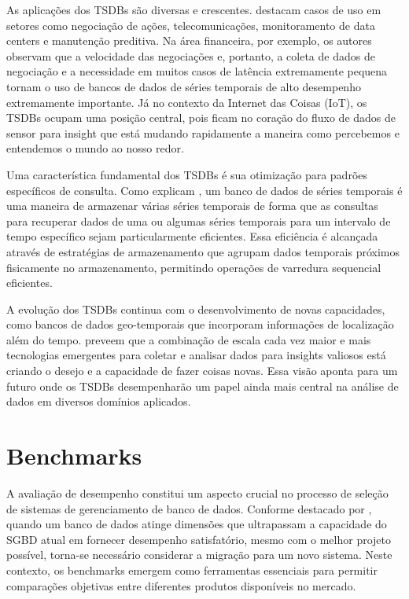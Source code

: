 As aplicações dos TSDBs são diversas e crescentes.  destacam casos de uso em setores como negociação de ações, telecomunicações, monitoramento de data centers e manutenção preditiva. Na área financeira, por exemplo, os autores observam que a velocidade das negociações e, portanto, a coleta de dados de negociação e a necessidade em muitos casos de latência extremamente pequena tornam o uso de bancos de dados de séries temporais de alto desempenho extremamente importante. Já no contexto da Internet das Coisas (IoT), os TSDBs ocupam uma posição central, pois ficam no coração do fluxo de dados de sensor para insight que está mudando rapidamente a maneira como percebemos e entendemos o mundo ao nosso redor.

Uma característica fundamental dos TSDBs é sua otimização para padrões específicos de consulta. Como explicam , um banco de dados de séries temporais é uma maneira de armazenar várias séries temporais de forma que as consultas para recuperar dados de uma ou algumas séries temporais para um intervalo de tempo específico sejam particularmente eficientes. Essa eficiência é alcançada através de estratégias de armazenamento que agrupam dados temporais próximos fisicamente no armazenamento, permitindo operações de varredura sequencial eficientes.

A evolução dos TSDBs continua com o desenvolvimento de novas capacidades, como bancos de dados geo-temporais que incorporam informações de localização além do tempo.  preveem que a combinação de escala cada vez maior e mais tecnologias emergentes para coletar e analisar dados para insights valiosos está criando o desejo e a capacidade de fazer coisas novas. Essa visão aponta para um futuro onde os TSDBs desempenharão um papel ainda mais central na análise de dados em diversos domínios aplicados.

\section{Benchmarks}

A avaliação de desempenho constitui um aspecto crucial no processo de seleção de sistemas de gerenciamento de banco de dados. Conforme destacado por , quando um banco de dados atinge dimensões que ultrapassam a capacidade do SGBD atual em fornecer desempenho satisfatório, mesmo com o melhor projeto possível, torna-se necessário considerar a migração para um novo sistema. Neste contexto, os benchmarks emergem como ferramentas essenciais para permitir comparações objetivas entre diferentes produtos disponíveis no mercado.

